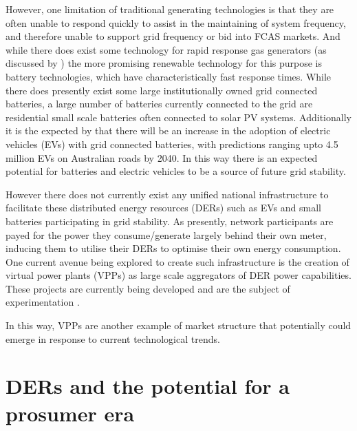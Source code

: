 However, one limitation of traditional generating technologies is that they are often unable to respond quickly to assist in the maintaining of system frequency, and therefore unable to support grid frequency or bid into FCAS markets.
And while there does exist some technology for rapid response gas generators (as discussed by \cite{GONZALEZSALAZAR20181497}) the more promising renewable technology for this purpose is battery technologies, which have characteristically fast response times.
While there does presently exist some large institutionally owned grid connected batteries, a large number of batteries currently connected to the grid are residential small scale batteries often connected to solar PV systems.
Additionally it is the expected by \cite{australianenergymarketoperatorlimited2019} that there will be an increase in the adoption of electric vehicles (EVs) with grid connected batteries, with predictions ranging upto 4.5 million EVs on Australian roads by 2040.
In this way there is an expected potential for batteries and electric vehicles to be a source of future grid stability.

However there does not currently exist any unified national infrastructure to facilitate these distributed energy resources (DERs) such as EVs and small batteries participating in grid stability.
As presently, network participants are payed for the power they consume/generate largely behind their own meter, inducing them to utilise their DERs to optimise their own energy consumption.
One current avenue being explored to create such infrastructure is the creation of virtual power plants (VPPs) as large scale aggregators of DER power capabilities. These projects are currently being developed and are the subject of experimentation \citep{australianenergymarketoperatorlimited20188}.


In this way, VPPs are another example of market structure that potentially could emerge in response to current technological trends.

\section{DERs and the potential for a prosumer era}


